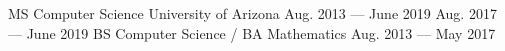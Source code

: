 
\vspace{-0.2cm}
\begin{cventries}
  \cventry
    {MS Computer Science} %
    {University of Arizona} %
    {Aug. 2013 --- June 2019} %
    {Aug. 2017 --- June 2019} %
    {}
    \vspace{-.55cm}
    \cventry
    {BS Computer Science / BA Mathematics} %
    {} %
    {} %
    {Aug. 2013 --- May 2017} %
    {}
  
\end{cventries}
